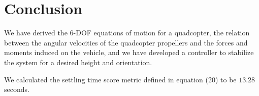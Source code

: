 \section*{Conclusion}

We have derived the 6-DOF equations of motion for a quadcopter, the relation between the angular velocities of the quadcopter propellers and the forces and moments induced on the vehicle, and we have developed a controller to stabilize the system for a desired height and orientation.

We calculated the settling time score metric defined in equation (20) to be $\boxed{13.28}$ seconds.